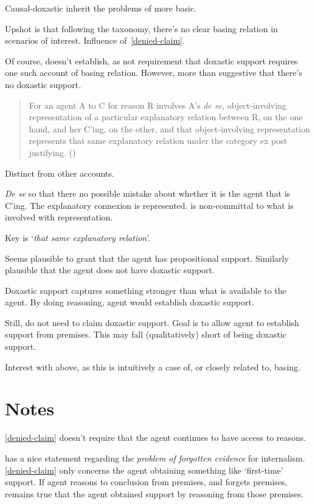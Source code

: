 \begin{note}[Doxastic]
  Causal-doxastic inherit the problems of more basic.

  Upshot is that following the taxonomy, there's no clear basing relation in scenarios of interest.
  Influence of~\ref{denied-claim}.

  Of course, doesn't establish, as not requirement that doxastic support requires one such account of basing relation.
  However, more than suggestive that there's no doxastic support.

  
\end{note}

\begin{note}
    \begin{quote}
    For an agent A to C for reason R involves A’s \emph{de se}, object-involving representation of a particular explanatory relation between R, on the one hand, and her C’ing, on the other, and that object-involving representation represents that same explanatory relation under the category ex post justifying.\nolinebreak
    \mbox{}\hfill\mbox{(\citeyear[204]{Neta:2019aa})}
  \end{quote}
  Distinct from other accounts.

  \emph{De se} so that there no possible mistake about whether it is the agent that is C'ing.
  The explanatory connexion is represented.
  \citeauthor{Neta:2019aa} is non-committal to what is involved with representation.

  Key is `\emph{that same explanatory relation}'.
\end{note}

\begin{note}[Summarising]
  Seems plausible to grant that the agent has propositional support.
  Similarly plausible that the agent does not have doxastic support.

  Doxastic support captures something stronger than what is available to the agent.
  By doing reasoning, agent would establish doxastic support.

  Still, do not need to claim doxastic support.
  Goal is to allow agent to establish support from premises.
  This may fall (qualitatively) short of being doxastic support.

  Interest with above, as this is intuitively a case of, or closely related to, basing.
\end{note}


\section{Notes}
\label{sec:notes}

\begin{note}[Memory]
  \ref{denied-claim} doesn't require that the agent continues to have access to reasons.

  \textcite[208]{Goldman:1999tr} has a nice statement regarding the \emph{problem of forgotten evidence} for internalism.
  \ref{denied-claim} only concerns the agent obtaining something like `first-time' support.
  If agent reasons to conclusion from premises, and forgets premises, remains true that the agent obtained support by reasoning from those premises.
\end{note}
